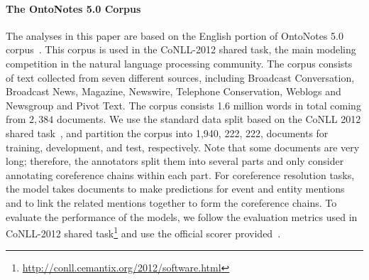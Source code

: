 \paragraph{\bf The OntoNotes 5.0 Corpus}
The analyses in this paper are based on the English portion of OntoNotes 5.0 corpus~\cite{pradhan2012conll}. This corpus is used in the CoNLL-2012 shared task, the main modeling competition in the natural language processing community. The corpus consists of text collected from seven different sources, including Broadcast Conversation, Broadcast News, Magazine, Newswire, Telephone Conservation, Weblogs and Newsgroup and Pivot Text.   
The corpus consists 1.6 million words in total coming from  $2,384$ documents. We use the standard data split based on the CoNLL 2012 shared task~\cite{pradhan2012conll}, and partition the corpus into 1,940, 222, 222, documents for training, development, and test, respectively. 
Note that some documents are very long; therefore, the annotators split them into several parts and only consider annotating coreference chains within each part.  
For coreference resolution tasks, the model takes documents to make predictions for event and entity mentions and to link the related mentions together to form the coreference chains. To evaluate the performance of the models,  we follow the evaluation metrics used in CoNLL-2012 shared task\footnote{\url{http://conll.cemantix.org/2012/software.html}} and use the official scorer provided~\cite{luo2014extension,pradhan2014scoring}.